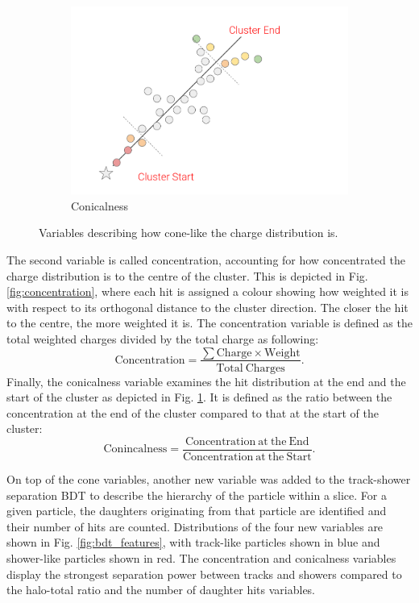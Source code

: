\begin{figure}[b!]
\begin{subfigure}[b]{0.495\textwidth}
            \includegraphics[width=\textwidth]{Conicalness}
            \caption{Conicalness}%
            \label{fig:conicalness}
        \end{subfigure}
        \caption[Cone-like Variable Diagrams]{
	Variables describing how cone-like the charge distribution is.
	}
        \label{fig:cone_variables}
\end{figure}

The second variable is called concentration, accounting for how concentrated the charge distribution is to the centre of the cluster.
This is depicted in Fig. \ref{fig:concentration}, where each hit is assigned a colour showing how weighted it is with respect to its orthogonal distance to the cluster direction.
The closer the hit to the centre, the more weighted it is.
The concentration variable is defined as the total weighted charges divided by the total charge as following:
\begin{equation}
	\mathrm{Concentration = \frac{\sum Charge \times Weight}{Total\ Charges}}.
\end{equation}
Finally, the conicalness variable examines the hit distribution at the end and the start of the cluster as depicted in Fig. \ref{fig:conicalness}. 
It is defined as the ratio between the concentration at the end of the cluster compared to that at the start of the cluster:
\begin{equation}
	\mathrm{Conincalness = \frac{Concentration\ at\ the\ End}{Concentration\ at\ the\ Start}}.
\end{equation}

On top of the cone variables, another new variable was added to the track-shower separation BDT to describe the hierarchy of the particle within a slice.
For a given particle, the daughters originating from that particle are identified and their number of hits are counted.
Distributions of the four new variables are shown in Fig. \ref{fig:bdt_features}, with track-like particles shown in blue and shower-like particles shown in red.
The concentration and conicalness variables display the strongest separation power between tracks and showers compared to the halo-total ratio and the number of daughter hits variables.

